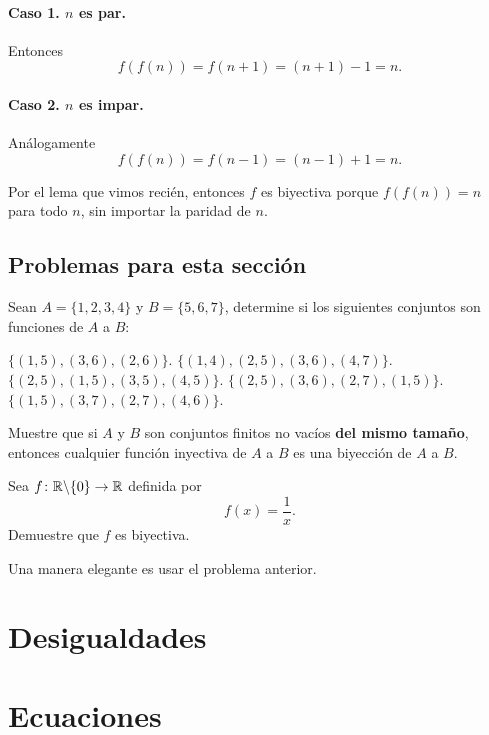 \paragraph{Caso 1. $n$ es par. } Entonces
\[f(f(n)) = f(n + 1) = (n + 1) - 1 = n.\]

\paragraph{Caso 2. $n$ es impar. } Análogamente
\[f(f(n)) = f(n - 1) = (n - 1) + 1 = n.\]

Por el lema que vimos recién, entonces $f$
es biyectiva porque $f(f(n)) = n$ para todo
$n$, sin importar la paridad de $n$.

\subsection*{Problemas para esta sección}
\begin{problem}
Sean $A = \{1, 2, 3, 4\}$ y $B = \{5, 6, 7\}$,
determine si los siguientes conjuntos
son funciones de $A$ a $B$:
\begin{itemize}
	\ii $\{(1, 5), (3, 6), (2, 6)\}$.
	\ii $\{(1, 4), (2, 5), (3, 6), (4, 7)\}$.
	\ii $\{(2, 5), (1, 5), (3, 5), (4, 5)\}$.
	\ii $\{(2, 5), (3, 6), (2, 7), (1, 5)\}$.
	\ii $\{(1, 5), (3, 7), (2, 7), (4, 6)\}$.
\end{itemize}
\end{problem}

\begin{problem}
Muestre que si $A$ y $B$ son
conjuntos finitos no vacíos
\textbf{del mismo tamaño},
entonces cualquier función
inyectiva de $A$ a $B$ es una
biyección de $A$ a $B$.
\end{problem}

\begin{problem}
Sea $f \colon \mathbb R\backslash\{0\} \to \mathbb R$ definida por
\[f(x) = \frac1x.\]
Demuestre que $f$ es biyectiva.
\begin{hints}
	\begin{hint}
		Una manera elegante es usar el problema anterior.
	\end{hint}
\end{hints}
\end{problem}

\section{Desigualdades}

\section{Ecuaciones}

